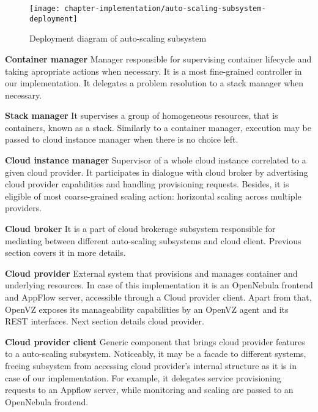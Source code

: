 \begin{figure}[!ht]
  \begin{center}
    \texttt{[image: chapter-implementation/auto-scaling-subsystem-deployment]}
  \end{center}
  \caption{Deployment diagram of auto-scaling subsystem}
  \label{fig:auto-scaling-subsystem-deployment}
\end{figure}

\begin{asparaenum}
 \item[\textbf{Container manager}] Manager responsible for supervising container lifecycle and taking apropriate actions when necessary. It is a most fine-grained controller in our implementation. It delegates a problem resolution to a stack manager when necessary.
 
 \item[\textbf{Stack manager}] It supervises a group of homogeneous resources, that is containers, known as a stack. Similarly to a container manager, execution may be passed to cloud instance manager when there is no choice left.
 
 \item[\textbf{Cloud instance manager}] Supervisor of a whole cloud instance correlated to a given cloud provider. It participates in dialogue with cloud broker by advertising cloud provider capabilities and handling provisioning requests. Besides, it is eligible of most coarse-grained scaling action: horizontal scaling across multiple providers.
 
 \item[\textbf{Cloud broker}] It is a part of cloud brokerage subsystem responsible for mediating between different auto-scaling subsystems and cloud client. Previous section covers it in more details.
 
 \item[\textbf{Cloud provider}] External system that provisions and manages container and underlying resources. In case of this implementation it is an OpenNebula frontend and AppFlow server, accessible through a Cloud provider client. Apart from that, OpenVZ exposes its manageability capabilities by an OpenVZ agent and its REST interfaces. Next section details cloud provider.
 
 \item[\textbf{Cloud provider client}] Generic component that brings cloud provider features to a auto-scaling subsystem. Noticeably, it may be a facade to different systems, freeing subsystem from accessing cloud provider's internal structure as it is in case of our implementation. For example, it delegates service provisioning requests to an Appflow server, while monitoring and scaling are passed to an OpenNebula frontend.
\end{asparaenum}

